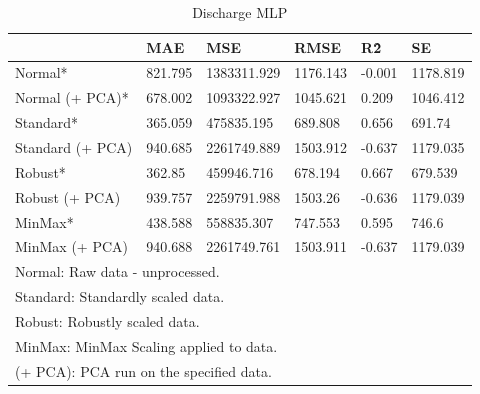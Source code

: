 \documentclass[conference]{IEEEtran}
\begin{document}
\begin{table}[H]
    \centering
    \caption{Discharge MLP}
    \begin{adjustbox}{width=\columnwidth,center}
    \begin{tabular}{llllll}
        ~ & MAE & MSE & RMSE & R\^2 & SE \\ \hline
        Normal* & 821.795 & 1383311.929 & 1176.143 & -0.001 & 1178.819 \\ 
        Normal (+ PCA)* & 678.002 & 1093322.927 & 1045.621 & 0.209 & 1046.412 \\ 
        Standard* & 365.059 & 475835.195 & 689.808 & 0.656 & 691.74 \\ 
        Standard (+ PCA) & 940.685 & 2261749.889 & 1503.912 & -0.637 & 1179.035 \\ 
        Robust*  & 362.85 & 459946.716 & 678.194 & 0.667 & 679.539 \\ 
        Robust (+ PCA) & 939.757 & 2259791.988 & 1503.26 & -0.636 & 1179.039 \\ 
        MinMax*  & 438.588 & 558835.307 & 747.553 & 0.595 & 746.6 \\ 
        MinMax (+ PCA) & 940.688 & 2261749.761 & 1503.911 & -0.637 & 1179.039 \\ 
        \bottomrule
        \multicolumn{6}{l}{\footnotesize *Normal: Raw data - unprocessed.}\\
        \multicolumn{6}{l}{\footnotesize *Standard: Standardly scaled data.}\\
        \multicolumn{6}{l}{\footnotesize *Robust: Robustly scaled data.}\\
        \multicolumn{6}{l}{\footnotesize *MinMax: MinMax Scaling applied to data.}\\
        \multicolumn{6}{l}{\footnotesize *(+ PCA): PCA run on the specified data.}\\
    \end{tabular}
    \end{adjustbox}
\end{table}
\end{document}
